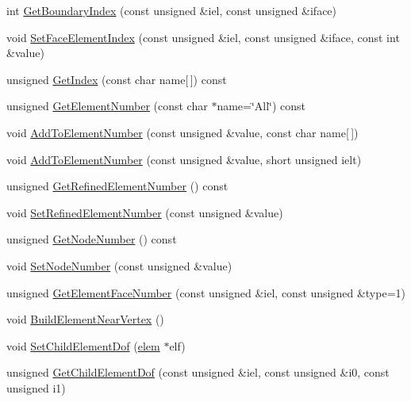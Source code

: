 \begin{DoxyCompactItemize}
\item 
int \mbox{\hyperlink{classfemus_1_1elem_a54ac1afbd613fe46b8c98be14a1c896f}{Get\+Boundary\+Index}} (const unsigned \&iel, const unsigned \&iface)
\item 
void \mbox{\hyperlink{classfemus_1_1elem_a58bffe5580e2007da669dfe8fa18ad16}{Set\+Face\+Element\+Index}} (const unsigned \&iel, const unsigned \&iface, const int \&value)
\item 
unsigned \mbox{\hyperlink{classfemus_1_1elem_aefab7a6647d4a5a2c4b1eee9c6d9e3da}{Get\+Index}} (const char name\mbox{[}$\,$\mbox{]}) const
\item 
unsigned \mbox{\hyperlink{classfemus_1_1elem_a199d03d1a04221741f3207d62ad755ca}{Get\+Element\+Number}} (const char $\ast$name=\char`\"{}All\char`\"{}) const
\item 
void \mbox{\hyperlink{classfemus_1_1elem_a3b5b113d293dbb0fda13c5afd656e94b}{Add\+To\+Element\+Number}} (const unsigned \&value, const char name\mbox{[}$\,$\mbox{]})
\item 
void \mbox{\hyperlink{classfemus_1_1elem_aec800bbb5cbdef0aed085ed68e2e9d6d}{Add\+To\+Element\+Number}} (const unsigned \&value, short unsigned ielt)
\item 
unsigned \mbox{\hyperlink{classfemus_1_1elem_a629acf1854d7c394ab093b02fe97351e}{Get\+Refined\+Element\+Number}} () const
\item 
void \mbox{\hyperlink{classfemus_1_1elem_a95a27cdaa1c8dd49a7573fc313bf38c3}{Set\+Refined\+Element\+Number}} (const unsigned \&value)
\item 
unsigned \mbox{\hyperlink{classfemus_1_1elem_a0b2541b53f5fb43859419d51e8e8fbb7}{Get\+Node\+Number}} () const
\item 
void \mbox{\hyperlink{classfemus_1_1elem_abbd019c7345566a2b7329d164d536df7}{Set\+Node\+Number}} (const unsigned \&value)
\item 
unsigned \mbox{\hyperlink{classfemus_1_1elem_a9e82d71b6b7cf76e83e37767627130e3}{Get\+Element\+Face\+Number}} (const unsigned \&iel, const unsigned \&type=1)
\item 
void \mbox{\hyperlink{classfemus_1_1elem_acde071b27d18837622099ce90f191d13}{Build\+Element\+Near\+Vertex}} ()
\item 
void \mbox{\hyperlink{classfemus_1_1elem_a6ec442274aeef5afd913e10a61a4f0ba}{Set\+Child\+Element\+Dof}} (\mbox{\hyperlink{classfemus_1_1elem}{elem}} $\ast$elf)
\item 
unsigned \mbox{\hyperlink{classfemus_1_1elem_a9063f54e2f2d3989c68984542888cf4b}{Get\+Child\+Element\+Dof}} (const unsigned \&iel, const unsigned \&i0, const unsigned i1)

\end{DoxyCompactItemize}
